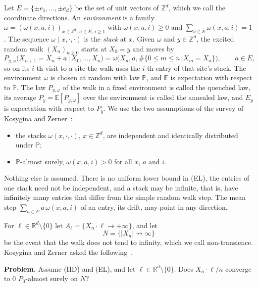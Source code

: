 \documentclass[11pt]{amsart}
\theoremstyle{remark}
\newcommand{\Z}{\mathbb{Z}}
\newcommand{\R}{\mathbb{R}}
\newcommand{\E}{\mathbb{E}}
\newcommand{\Prob}{\mathbb{P}}
\begin{document}
Let $E=\{\pm e_1,\dots,\pm e_d\}$ be the set of unit vectors of $\Z^d$, which we call the coordinate directions. An \emph{environment} is a family
$\omega=(\omega(x,a,i))_{x\in\Z^d,\,a\in E,\,i\ge1}$ with $\omega(x,a,i)\ge0$ and $\sum_{a\in E}\omega(x,a,i)=1$. The
sequence $\omega(x,\cdot,\cdot)$ is the \emph{stack} at $x$. Given $\omega$ and $y\in\Z^d$, the excited random walk
$(X_n)_{n\ge0}$ starts at $X_0=y$ and moves by
\begin{equation}\label{eq:step}
P_{y,\omega}\bigl(X_{n+1}=X_n+a\,\big|\,X_0,\dots,X_n\bigr)=\omega\bigl(X_n,a,\#\{0\le m\le n:X_m=X_n\}\bigr),\qquad a\in E,
\end{equation}
so on its $i$-th visit to a site the walk uses the $i$-th entry of that site's stack. The environment $\omega$ is chosen at
random with law $\Prob$, and $\E$ is expectation with respect to $\Prob$. The law $P_{y,\omega}$ of the walk in a fixed
environment is called the quenched law, its average $P_y=\E[P_{y,\omega}]$ over the environment is called the annealed
law, and $E_y$ is expectation with respect to $P_y$. We use the two assumptions of the survey of Kosygina and
Zerner~\cite{KZ13}:
\begin{itemize}
\item[(IID)] the stacks $\omega(x,\cdot,\cdot)$, $x\in\Z^d$, are independent and identically distributed under $\Prob$;
\item[(EL)] $\Prob$-almost surely, $\omega(x,a,i)>0$ for all $x$, $a$ and $i$.
\end{itemize}
Nothing else is assumed. There is no uniform lower bound in (EL), the entries of one stack need not be independent, and a
stack may be infinite, that is, have infinitely many entries that differ from the simple random walk step. The mean step
$\sum_{a\in E}a\,\omega(x,a,i)$ of an entry, its drift, may point in any direction.

For $\ell\in\R^d\setminus\{0\}$ let $A_\ell=\{X_n\cdot\ell\to+\infty\}$, and let
\[
N=\bigl\{|X_n|\not\to\infty\bigr\}
\]
be the event that the walk does not tend to infinity, which we call non-transience. Kosygina and Zerner asked the following~\cite[Problem 4.7]{KZ13}.

\medskip\noindent\textbf{Problem.} Assume (IID) and (EL), and let $\ell\in\R^d\setminus\{0\}$. Does $X_n\cdot\ell/n$
converge to $0$ $P_0$-almost surely on $N$?
\end{document}
